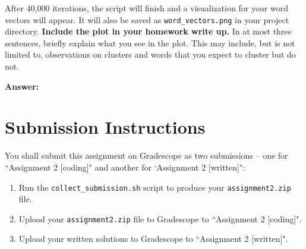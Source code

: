 \documentclass{article}
\newenvironment{answer}{
    {\bf Answer:} \sf \begingroup\color{red}
}{\endgroup}%
\begin{document}
\begin{enumerate}[label=(\alph*)]
    After 40,000 iterations, the script will finish and a visualization for your word vectors will appear. It will also be saved as \texttt{word\_vectors.png} in your project directory. \textbf{Include the plot in your homework write up.} In at most three sentences, briefly explain what you see in the plot. This may include, but is not limited to, observations on clusters and words that you expect to cluster but do not.
    
\begin{shaded}
\begin{answer}

\end{answer}
\end{shaded}

\section{Submission Instructions}
You shall submit this assignment on Gradescope as two submissions -- one for ``Assignment 2 [coding]" and another for `Assignment 2 [written]":
\begin{enumerate}
    \item Run the \texttt{collect\_submission.sh} script to produce your \texttt{assignment2.zip} file.
    \item Upload your \texttt{assignment2.zip} file to Gradescope to ``Assignment 2 [coding]".
    \item Upload your written solutions to Gradescope to ``Assignment 2 [written]".
\end{enumerate}

\end{enumerate}
\end{document}
